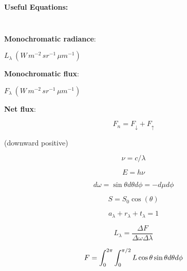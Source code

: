 \documentclass[12pt]{article}
\begin{document}
\begin{center}
  \textbf{Useful Equations:}
\end{center}



\begin{multicols}{2}


\noindent

$~$

\noindent

$~$

\textbf{Monochromatic radiance}:

$L_\lambda\ (W\,m^{-2}\,sr^{-1}\,\mu m^{-1})$

\vspace{0.1in}

\textbf{Monochromatic flux}:

$F_\lambda\ (W\,m^{-2}\,sr^{-1}\,\mu m^{-1})$


\vspace{0.1in}

\textbf{Net flux}:

\begin{equation}
  \label{eq:net}
F_n = F_\downarrow + F_\uparrow
\end{equation}

(downward positive)

\begin{equation}
 \nu = c/\lambda 
\end{equation}

\begin{equation}
E = h\nu
\end{equation}

\begin{equation}
  \label{eq:omega}
  d \omega = \sin \theta d\theta d\phi = -d\mu d\phi
\end{equation}

\begin{equation}
  \label{eq:cos}
  S = S_0 \cos(\theta)
\end{equation}

\begin{equation}
  \label{eq:conservation}
  a_\lambda + r_\lambda + t_\lambda = 1
\end{equation}

\begin{equation}
  \label{eq:intensity}
  L_\lambda = \frac{\Delta F}{\Delta \omega \Delta \lambda}
\end{equation}


\begin{equation}
  \label{eq:black}
F=\int_0^{2 \pi} \int_0^{\pi / 2} L \cos \theta \sin \theta d \theta d \phi \\
\end{equation}


\end{multicols}
\end{document}
